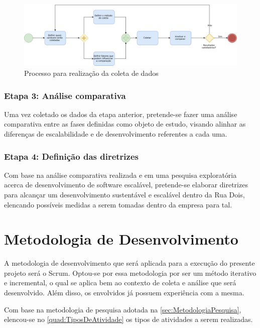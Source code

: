     \begin{figure}[h]
      \caption{Processo para realização da coleta de dados\label{fig:ProcessoAnaliseComparativa}}
      \centering
      \includegraphics[keepaspectratio=true,scale=0.5]{figuras/metodologiaAnalise.eps}
    \end{figure}

\subsubsection{Etapa 3: Análise comparativa}

Uma vez coletado os dados da etapa anterior, pretende-se fazer uma análise comparativa
entre as fases definidas como objeto de estudo, visando alinhar as diferenças de
escalabilidade e de desenvolvimento referentes a cada uma.

\subsubsection{Etapa 4: Definição das diretrizes}

Com base na análise comparativa realizada e em uma pesquisa exploratória acerca de
desenvolvimento de software escalável, pretende-se elaborar diretrizes para alcançar
um desenvolvimento sustentável e escalável dentro da Rua Dois, elencando possíveis
medidas a serem tomadas dentro da empresa para tal.


\section{Metodologia de Desenvolvimento}

A metodologia de desenvolvimento que será aplicada para a execução do presente
projeto será o Scrum. Optou-se por essa metodologia por ser um método iterativo
e incremental, o qual se aplica bem ao contexto de coleta e análise que será
desenvolvido. Além disso, os envolvidos já possuem experiência com a mesma.

Com base na metodologia de pesquisa adotada na \autoref{sec:MetodologiaPesquisa},
elencou-se no \autoref{quad:TiposDeAtividade} os tipos de atividades a serem
realizadas.

